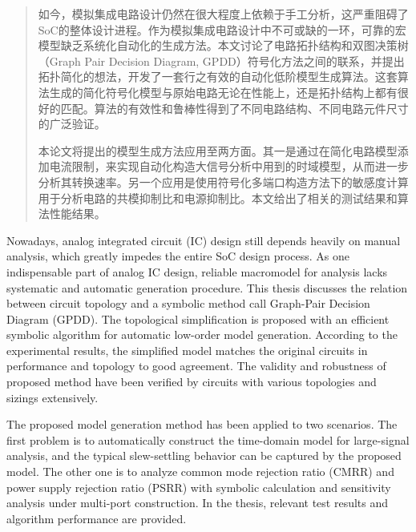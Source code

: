 
\begin{abstract}

如今，模拟集成电路设计仍然在很大程度上依赖于手工分析，这严重阻碍了SoC的整体设计进程。作为模拟集成电路设计中不可或缺的一环，可靠的宏模型缺乏系统化自动化的生成方法。本文讨论了电路拓扑结构和双图决策树（Graph Pair Decision Diagram, GPDD）符号化方法之间的联系，并提出拓扑简化的想法，开发了一套行之有效的自动化低阶模型生成算法。这套算法生成的简化符号化模型与原始电路无论在性能上，还是拓扑结构上都有很好的匹配。算法的有效性和鲁棒性得到了不同电路结构、不同电路元件尺寸的广泛验证。

本论文将提出的模型生成方法应用至两方面。其一是通过在简化电路模型添加电流限制，来实现自动化构造大信号分析中用到的时域模型，从而进一步分析其转换速率。另一个应用是使用符号化多端口构造方法下的敏感度计算用于分析电路的共模抑制比和电源抑制比。本文给出了相关的测试结果和算法性能结果。

\end{abstract}

\begin{englishabstract}

Nowadays, analog integrated circuit (IC) design still depends heavily on manual analysis, which greatly impedes the entire SoC design process. As one indispensable part of analog IC design, reliable macromodel for analysis lacks systematic and automatic generation procedure. This thesis discusses the relation between circuit topology and a symbolic method call Graph-Pair Decision Diagram (GPDD). The topological simplification is proposed with an efficient symbolic algorithm for automatic low-order model generation. According to the experimental results, the simplified model matches the original circuits in performance and topology to good agreement. The validity and robustness of proposed method have been verified by circuits with various topologies and sizings extensively.

The proposed model generation method has been applied to two scenarios. The first problem is to automatically construct the time-domain model for large-signal analysis, and the typical slew-settling behavior can be captured by the proposed model. The other one is to analyze common mode rejection ratio (CMRR) and power supply rejection ratio (PSRR) with symbolic calculation and sensitivity analysis under multi-port construction. In the thesis, relevant test results and algorithm performance are provided.


\end{englishabstract}

